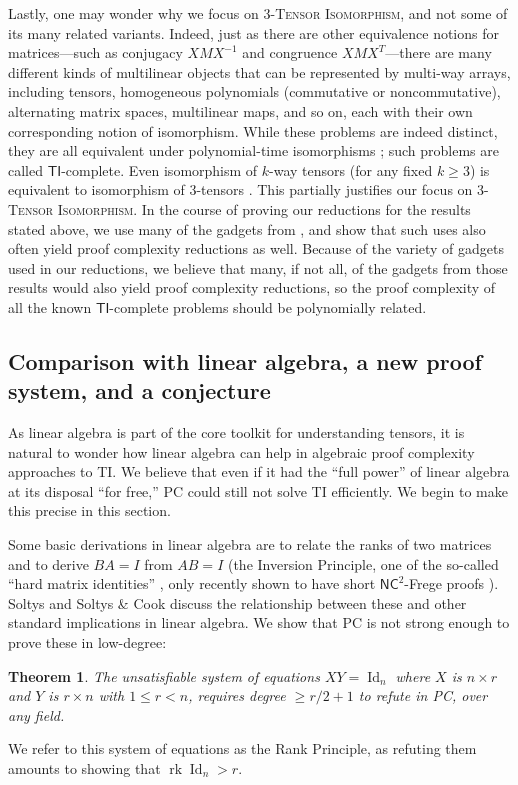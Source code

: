 \documentclass[10pt,a4paper]{article}
\newtheorem{theorem}{Theorem}[section]
\theoremstyle{definition}
\DeclareMathOperator{\Id}{Id}
\DeclareMathOperator{\rk}{rk}
\begin{document}
Lastly, one may wonder why we focus on 3-\textsc{Tensor Isomorphism}, and not some of its many related variants. Indeed, just as there are other equivalence notions for matrices---such as conjugacy $XMX^{-1}$ and congruence $XMX^T$---there are many different kinds of multilinear objects that can be represented by multi-way arrays, including tensors, homogeneous polynomials (commutative or noncommutative), alternating matrix spaces, multilinear maps, and so on, each with their own corresponding notion of isomorphism. While these problems are indeed distinct, they are all equivalent under polynomial-time isomorphisms \cite{FGS, GQ}; such problems are called $\mathsf{TI}$-complete. Even isomorphism of $k$-way tensors (for any fixed $k \geq 3$) is equivalent to isomorphism of 3-tensors \cite{GQ}. This partially justifies our focus on \textsc{3-Tensor Isomorphism}. In the course of proving our reductions for the results stated above, we use many of the gadgets from \cite{FGS, GQ}, and show that such uses also often yield proof complexity reductions as well. Because of the variety of gadgets used in our reductions, we believe that many, if not all, of the gadgets from those results would also yield proof complexity reductions, so the proof complexity of all the known $\mathsf{TI}$-complete problems should be polynomially related.

\subsection{Comparison with linear algebra, a new proof system, and a conjecture} \label{sec:conj}
As linear algebra is part of the core toolkit for understanding tensors, it is natural to wonder how linear algebra can help in algebraic proof complexity approaches to \textsc{TI}. We believe that even if it had the ``full power'' of linear algebra at its disposal ``for free,'' PC could still not solve \textsc{TI} efficiently. We begin to make this precise in this section.

Some basic derivations in linear algebra are to relate the ranks of two matrices and to derive $BA=I$ from $AB=I$ (the Inversion Principle, one of the so-called ``hard matrix identities'' \cite{SC}, only recently shown to have short $\mathsf{NC}^2$-Frege proofs \cite{HT}). Soltys \cite{soltys} and Soltys \& Cook \cite{SC} discuss the relationship between these and other standard implications in linear algebra. We show that PC is not strong enough to prove these in low-degree:

\begin{theorem}
The unsatisfiable system of equations $XY=\Id_n$ where $X$ is $n \times r$ and $Y$ is $r \times n$ with $1 \leq r < n$, requires degree $\geq r/2+1$ to refute in PC, over any field.
\end{theorem}
We refer to this system of equations as the Rank Principle, as refuting them amounts to showing that $\rk \Id_n > r$. 
\end{document}
